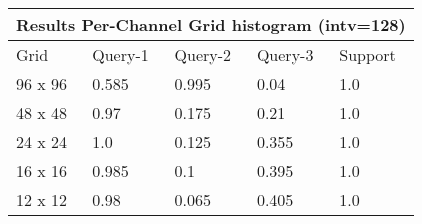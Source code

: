 \documentclass[12pt]{article}
\begin{document}
\begin{tabular}{ |p{1.5cm}||p{2cm}|p{2cm}|p{2cm}|p{2cm}|  }
    \hline
    \multicolumn{5}{|c|}{Results Per-Channel Grid histogram (intv=128)} \\
    \hline
    Grid & Query-1 & Query-2 & Query-3 & Support \\
    \hline
    96 x 96 & 0.585 & 0.995 & 0.04 & 1.0 \\
    \hline
    48 x 48 & 0.97 & 0.175 & 0.21 & 1.0 \\
    \hline
    24 x 24 & 1.0 & 0.125 & 0.355 & 1.0 \\
    \hline
    16 x 16 & 0.985 & 0.1 & 0.395 & 1.0 \\
    \hline
    12 x 12 & 0.98 & 0.065 & 0.405 & 1.0 \\
    \hline
\end{tabular}
\end{document}
